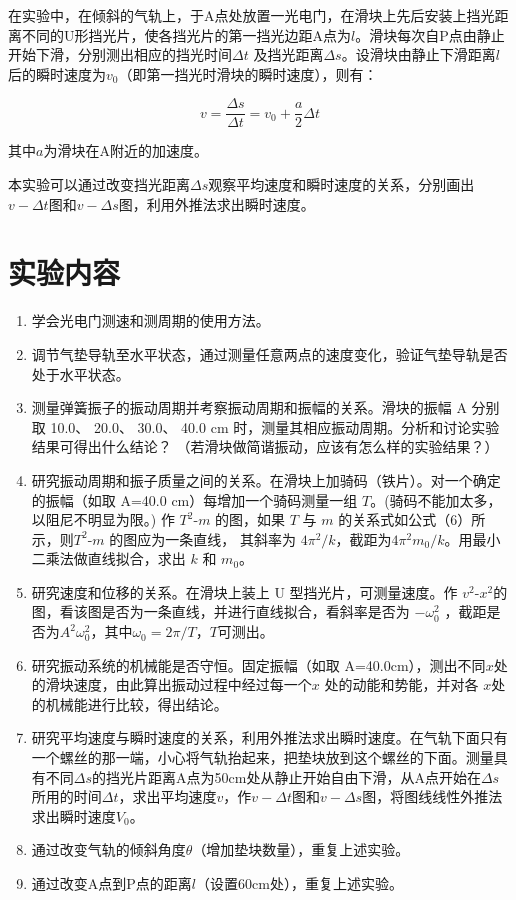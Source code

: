 \documentclass[11pt]{article}
\begin{document}
在实验中，在倾斜的气轨上，于A点处放置一光电门，在滑块上先后安装上挡光距离不同的U形挡光片，使各挡光片的第一挡光边距A点为$l$。滑块每次自P点由静止开始下滑，分别测出相应的挡光时间$\Delta t$ 及挡光距离$\Delta s$。设滑块由静止下滑距离$l$后的瞬时速度为$v_{0}$（即第一挡光时滑块的瞬时速度），则有：

\begin{equation}
    v=\frac{\Delta s}{\Delta t}=v_{0}+\frac{a}{2}\Delta t
\end{equation}

其中$a $为滑块在A附近的加速度。

本实验可以通过改变挡光距离$\Delta s$观察平均速度和瞬时速度的关系，分别画出$v-\Delta t$图和$v-\Delta s$图，利用外推法求出瞬时速度。

\section{实验内容}

\begin{enumerate}
    \item 学会光电门测速和测周期的使用方法。
    \item 调节气垫导轨至水平状态，通过测量任意两点的速度变化，验证气垫导轨是否处于水平状态。 
    \item 测量弹簧振子的振动周期并考察振动周期和振幅的关系。滑块的振幅 A 分别取 10.0、 20.0、 30.0、 40.0 cm 时，测量其相应振动周期。分析和讨论实验结果可得出什么结论？ （若滑块做简谐振动，应该有怎么样的实验结果？） 
    \item 研究振动周期和振子质量之间的关系。在滑块上加骑码（铁片）。对一个确定的振幅（如取 A=40.0 cm）每增加一个骑码测量一组 $T$。(骑码不能加太多，以阻尼不明显为限。) 作 $T^{2}‐m$ 的图，如果 $T$ 与 $m$ 的关系式如公式（6）所示，则$T^{2}‐m$ 的图应为一条直线， 其斜率为 $4\pi^{2} /k $，截距为$4\pi^{2} m_{0} /k $。用最小二乘法做直线拟合，求出 $k$ 和 $m_{0}$。 
    \item 研究速度和位移的关系。在滑块上装上 U 型挡光片，可测量速度。作 $v^{2} ‐x^{2} $的图，看该图是否为一条直线，并进行直线拟合，看斜率是否为 $-\omega^{2}_{0}$ ，截距是否为$A^{2} \omega^{2}_{0} $，其中$\omega_{0}=2\pi /T $，$T$可测出。
    \item 研究振动系统的机械能是否守恒。固定振幅（如取 A=40.0cm），测出不同$ x $处的滑块速度，由此算出振动过程中经过每一个$ x$ 处的动能和势能，并对各 $x $处的机械能进行比较，得出结论。
    \item 研究平均速度与瞬时速度的关系，利用外推法求出瞬时速度。在气轨下面只有一个螺丝的那一端，小心将气轨抬起来，把垫块放到这个螺丝的下面。测量具有不同$\Delta s$的挡光片距离A点为50cm处从静止开始自由下滑，从A点开始在$\Delta s$所用的时间$\Delta t$，求出平均速度$v$，作$v-\Delta t$图和$v-\Delta s$图，将图线线性外推法求出瞬时速度$V_{0}$。
    \item 通过改变气轨的倾斜角度$\theta$（增加垫块数量），重复上述实验。
    \item 通过改变A点到P点的距离$l$（设置60cm处），重复上述实验。
\end{enumerate}
\end{document}
